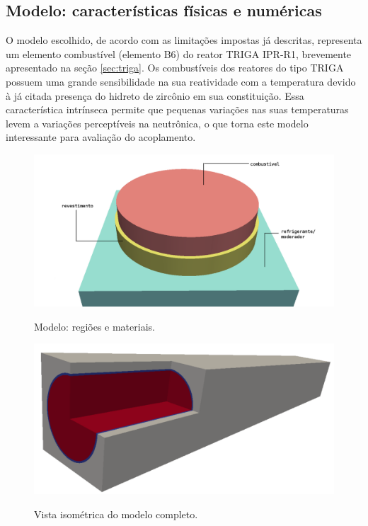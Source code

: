 


\subsection{Modelo: características físicas e numéricas}
\label{ssec:mod_fis_num}

O modelo escolhido, de acordo com as limitações impostas já descritas,
representa um elemento combustível (elemento B6) do reator TRIGA IPR-R1, brevemente
apresentado na seção \ref{sec:triga}. Os combustíveis dos reatores do tipo TRIGA
possuem uma grande sensibilidade na sua
reatividade com a temperatura devido à já citada presença do hidreto de zircônio
em sua constituição. Essa característica intrínseca permite que pequenas
variações nas suas temperaturas levem a variações perceptíveis na neutrônica,
o que torna este modelo interessante para avaliação do acoplamento.


\begin{figure}[htb]
  \caption{Modelo: regiões e materiais.}%
  \centering\includegraphics[scale=0.5]{figuras/regioes_surface2.png}
  \label{fig:regions}
\end{figure}

\begin{figure}[htb]
  \caption{Vista isométrica do modelo completo.}
  \centering\includegraphics[scale=0.6]{figuras/all_regions_isometric.png}
  \label{fig:region_isometric}
\end{figure}

